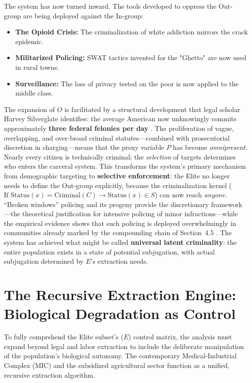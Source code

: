The system has now turned inward. The tools developed to oppress the Out-group are being deployed against the In-group:
\begin{itemize}
    \item \textbf{The Opioid Crisis:} The criminalization of white addiction mirrors the crack epidemic.
    \item \textbf{Militarized Policing:} SWAT tactics invented for the "Ghetto" are now used in rural towns.
    \item \textbf{Surveillance:} The loss of privacy tested on the poor is now applied to the middle class.
\end{itemize}

The expansion of $O$ is facilitated by a structural development that legal scholar Harvey Silverglate identifies: the average American now unknowingly commits approximately \textbf{three federal felonies per day} \cite{silverglate}. The proliferation of vague, overlapping, and over-broad criminal statutes---combined with prosecutorial discretion in charging---means that the proxy variable $P$ has become \textit{omnipresent}. Nearly every citizen is technically criminal; the \textit{selection} of targets determines who enters the carceral system. This transforms the system's primary mechanism from demographic targeting to \textbf{selective enforcement}: the Elite no longer needs to define the Out-group explicitly, because the criminalization kernel ($\text{If } \text{Status}(x) = \text{Criminal}(C) \rightarrow \text{Status}(x) \in S$) can now reach \textit{anyone}. ``Broken windows'' policing \cite{wilson} and its progeny provide the discretionary framework---the theoretical justification for intensive policing of minor infractions---while the empirical evidence shows that such policing is deployed overwhelmingly in communities already marked by the compounding chain of Section~4.5 \cite{harcourt}. The system has achieved what might be called \textbf{universal latent criminality}: the entire population exists in a state of potential subjugation, with actual subjugation determined by $E$'s extraction needs.

\section{The Recursive Extraction Engine: Biological Degradation as Control}

To fully comprehend the Elite subset’s ($E$) control matrix, the analysis must expand beyond legal and labor extraction to include the deliberate manipulation of the population's biological autonomy. The contemporary Medical-Industrial Complex (MIC) and the subsidized agricultural sector function as a unified, recursive extraction algorithm.

